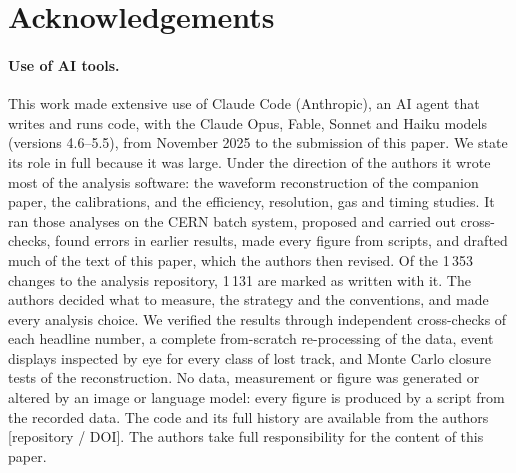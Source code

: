 \documentclass[11pt,a4paper]{article}
\begin{document}
\appendix







\section*{Acknowledgements}

\paragraph{Use of AI tools.}
This work made extensive use of Claude Code (Anthropic), an AI agent that writes and runs code, with the Claude
Opus, Fable, Sonnet and Haiku models (versions 4.6--5.5), from November 2025 to the submission of this paper. We state
its role in full because it was large. Under the direction of the authors it wrote most of the analysis software:
the waveform reconstruction of the companion paper, the calibrations, and the efficiency, resolution, gas and timing
studies. It ran those analyses on the CERN batch system, proposed and carried out cross-checks, found errors in
earlier results, made every figure from scripts, and drafted much of the text of this paper, which the authors then
revised. Of the 1\,353 changes to the analysis repository, 1\,131 are marked as written with it.
The authors decided what to measure, the strategy and the conventions, and made every analysis choice. We verified
the results through independent cross-checks of each headline number, a complete from-scratch re-processing of the
data, event displays inspected by eye for every class of lost track, and Monte Carlo closure tests of the
reconstruction. No data, measurement or figure was generated or altered by an image or language model: every figure is
produced by a script from the recorded data. The code and its full history are available from the authors
[repository / DOI]. The authors take full responsibility for the content of this paper.



\end{document}
